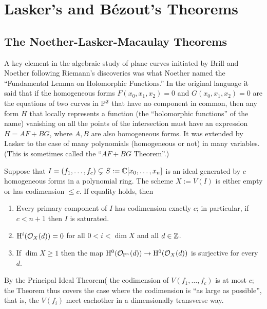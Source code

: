 

\chapter{Lasker's and B\'ezout's Theorems}

\section{The Noether-Lasker-Macaulay Theorems}

A key element in the algebraic study of plane curves initiated by Brill and Noether following Riemann's discoveries was what Noether named the ``Fundamental Lemma on Holomorphic Functions.'' In the original language it said that if the homogeneous forms $F(x_{0},x_{1},x_{2})=0$ and $G(x_{0},x_{1},x_{2})=0$ are the equations of two curves in $\PP^{2}$ that have no component in common, then any form $H$ that locally represents a function (the ``holomorphic functions'' of the name) vanishing on all the points
of the intersection must have an expression $H = AF+BG$, where $A,B$ are also homogeneous forms. It was extended by Lasker to the case of many polynomials (homogeneous or not) in many variables. (This is sometimes called the ``$AF+BG$ Theorem''.) 

\begin{theorem}\label{Lasker}
Suppose that $I = (f_{1}, \dots, f_{c}) \subsetneq S:=\CC[x_{0},\dots,x_{n}]$ is an ideal generated by $c$ homogeneous forms in a polynomial ring. 
The scheme $X:= V(I)$ is either empty or has codimension $\leq c$. If equality holds, then
\begin{enumerate}
 \item Every primary component of $I$ has codimension exactly $c$; in particular, if $c<n+1$ then $I$ is saturated.
 \item $\HH^{i}(\cO_{X}(d)) = 0$ for all $0<i<\dim X$ and all $d\in \ZZ$.
 \item If $\dim X\geq 1$
then the map
$\HH^{0}(\cO_{\PP^{n}}(d)) \to \HH^{0}(\cO_{X}(d))$ is surjective for every $d$.
\end{enumerate}
\end{theorem}

By the Principal Ideal Theorem(\cite[Theorem ***]{Eisenbud95} the codimension of $V(f_{1},\dots, f_{c})$ is at most $c$;
the Theorem thus covers the case where the codimension is ``as large as possible'', that is, the $V(f_{i})$ meet eachother
in a dimensionally transverse way.

